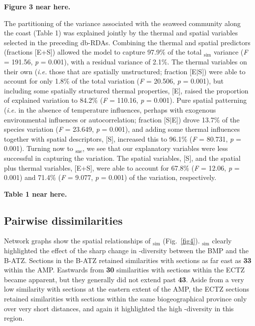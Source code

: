 \documentclass[utf8]{frontiersSCNS} %
\begin{document}
\textbf{Figure 3 near here.}

The partitioning of the variance associated with the seaweed community along the coast (Table 1) was explained jointly by the thermal and
spatial variables selected in the preceding db-RDAs. Combining the thermal and spatial predictors (fractions {[}E+S{]}) allowed the model
to capture 97.9\% of the total \textbeta$_{\text{sim}}$ variance (\emph{F} = 191.56, \emph{p} = 0.001), with a residual variance of 2.1\%. The thermal
variables on their own (\emph{i.e.} those that are spatially unstructured; fraction {[}E$\vert$S{]}) were able to account for only 1.8\% of the total variation (\emph{F} = 20.506, \emph{p} = 0.001), but including some spatially structured thermal properties, {[}E{]}, raised the proportion of explained variation to 84.2\% (\emph{F} = 110.16, \emph{p} = 0.001). Pure spatial patterning (\emph{i.e.} in the absence of temperature influences, perhaps with exogenous environmental influences or autocorrelation; fraction {[}S$\vert$E{]}) drove 13.7\% of the species variation (\emph{F} = 23.649, \emph{p} = 0.001), and adding some thermal influences together with spatial descriptors, {[}S{]}, increased this to 96.1\% (\emph{F} = 80.731, \emph{p} = 0.001). Turning now to \textbeta$_{\text{sne}}$, we see that our explanatory variables were less successful in capturing the variation. The spatial variables, {[}S{]}, and the spatial plus thermal variables, {[}E+S{]}, were able to account for 67.8\% (\emph{F} = 12.06, \emph{p} = 0.001) and 71.4\% (\emph{F} = 9.077, \emph{p} = 0.001) of the variation, respectively.

\textbf{Table 1 near here.}

\subsection{Pairwise dissimilarities}

Network graphs show the spatial relationships of \textbeta$_{\text{sim}}$ (Fig.~\ref{fig4}). \textbeta$_{\text{sim}}$ clearly highlighted the effect of the sharp change in \textalpha-diversity between the BMP and the B-ATZ. Sections in the B-ATZ retained similarities with sections as far east as \textbf{33} within the AMP. Eastwards from \textbf{30} similarities with sections within the ECTZ became apparent, but they generally did not extend past \textbf{43}. Aside from a very low similarity with sections at the eastern extent of the AMP, the ECTZ sections retained similarities with sections within the same biogeographical province only over very short distances, and again it highlighted the high \textbeta-diversity in this region.
\end{document}
